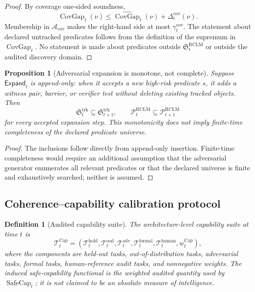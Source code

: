 \documentclass[11pt,a4paper]{article}
\newtheorem{proposition}[theorem]{Proposition}
\newtheorem{definition}[theorem]{Definition}
\newcommand{\Pcal}{\mathcal P}
\newcommand{\Acal}{\mathcal A}
\newcommand{\Tcal}{\mathcal T}
\newcommand{\hold}{\mathrm{hold}}
\newcommand{\adv}{\mathrm{adv}}
\newcommand{\RCLM}{\mathrm{RCLM}}
\providecommand{\Cap}{\operatorname{Cap}}
\newcommand{\SafeCap}{\operatorname{SafeCap}}
\newcommand{\cov}{\mathrm{cov}}
\newcommand{\trk}{\mathrm{trk}}
\newcommand{\ood}{\mathrm{ood}}
\begin{document}
\begin{proof}
By coverage one-sided soundness,
\[
\operatorname{CovGap}_t(\nu)
\le
\widehat{\operatorname{CovGap}}_t(\nu)+\Delta_t^{\cov}(\nu).
\]
Membership in \(\Acal_{\cov}\) makes the right-hand side at most \(\gamma_t^{\cov}\). The statement about declared untracked predicates follows from the definition of the supremum in \(\operatorname{CovGap}_t\). No statement is made about predicates outside \(\mathfrak S_t^{\RCLM}\) or outside the audited discovery domain.
\end{proof}

\begin{proposition}[Adversarial expansion is monotone, not complete]
\label{prop:adversarial-expansion-monotone}
Suppose \(\mathsf{Expand}_t\) is append-only: when it accepts a new high-risk predicate \(s\), it adds a witness pair, barrier, or verifier test without deleting existing tracked objects. Then
\[
\mathfrak S_t^{\trk}\subseteq\mathfrak S_{t+1}^{\trk},
\qquad
\Pcal_t^{\RCLM}\subseteq\Pcal_{t+1}^{\RCLM}
\]
for every accepted expansion step. This monotonicity does not imply finite-time completeness of the declared predicate universe.
\end{proposition}

\begin{proof}
The inclusions follow directly from append-only insertion. Finite-time completeness would require an additional assumption that the adversarial generator enumerates all relevant predicates or that the declared universe is finite and exhaustively searched; neither is assumed.
\end{proof}

\subsection{Coherence--capability calibration protocol}

\begin{definition}[Audited capability suite]
\label{def:audited-capability-suite}
The architecture-level capability suite at time \(t\) is
\[
\Tcal_t^{\Cap}=
(\Tcal_t^{\hold},\Tcal_t^{\ood},\Tcal_t^{\adv},\Tcal_t^{\mathrm{formal}},\Tcal_t^{\mathrm{human}},w_t^{\Cap}),
\]
where the components are held-out tasks, out-of-distribution tasks, adversarial tasks, formal tasks, human-reference audit tasks, and nonnegative weights. The induced safe-capability functional is the weighted audited quantity used by \(\SafeCap_t\); it is not claimed to be an absolute measure of intelligence.
\end{definition}
\end{document}
